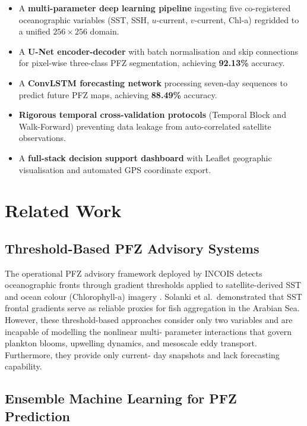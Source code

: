 \documentclass[conference]{IEEEtran}
\begin{document}
\begin{itemize}
    \item A \textbf{multi-parameter deep learning pipeline} ingesting
    five co-registered oceanographic variables (SST, SSH, $u$-current,
    $v$-current, Chl-a) regridded to a unified $256 \times 256$ domain.
    \item A \textbf{U-Net encoder-decoder} with batch normalisation and
    skip connections for pixel-wise three-class PFZ segmentation,
    achieving \textbf{92.13\%} accuracy.
    \item A \textbf{ConvLSTM forecasting network} processing seven-day
    sequences to predict future PFZ maps, achieving \textbf{88.49\%}
    accuracy.
    \item \textbf{Rigorous temporal cross-validation protocols} (Temporal
    Block and Walk-Forward) preventing data leakage from auto-correlated
    satellite observations.
    \item A \textbf{full-stack decision support dashboard} with Leaflet
    geographic visualisation and automated GPS coordinate export.
\end{itemize}

\section{Related Work}

\subsection{Threshold-Based PFZ Advisory Systems}

The operational PFZ advisory framework deployed by INCOIS detects
oceanographic fronts through gradient thresholds applied to
satellite-derived SST and ocean colour (Chlorophyll-a) imagery
\cite{solanki2003}. Solanki et al.\ demonstrated that SST frontal
gradients serve as reliable proxies for fish aggregation in the
Arabian Sea. However, these threshold-based approaches consider only
two variables and are incapable of modelling the nonlinear multi-
parameter interactions that govern plankton blooms, upwelling dynamics,
and mesoscale eddy transport. Furthermore, they provide only current-
day snapshots and lack forecasting capability.

\subsection{Ensemble Machine Learning for PFZ Prediction}
\end{document}
